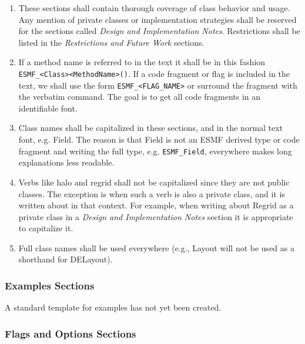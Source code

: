 \begin{enumerate}
\item These sections shall contain thorough coverage of class
behavior and usage.  Any mention of private classes or implementation 
strategies shall be reserved for the sections called {\it Design and 
Implementation Notes}.  Restrictions shall be listed in the 
{\it Restrictions and Future Work} sections.
  
\item If a method name is referred to in the text it shall be in this
fashion {\tt ESMF\_<Class><MethodName>()}.  If a code fragment or flag is
included in the text, we shall use the form {\tt ESMF\_<FLAG\_NAME>} 
or surround the fragment with the \latex  verbatim command.  The 
goal is to get all code fragments in an identifiable font.

\item Class names shall be capitalized in these sections, and
in the normal text font, e.g. Field.  The reason is that 
Field is not an ESMF derived type or code fragment and writing 
the full type, e.g. {\tt ESMF\_Field}, everywhere makes long 
explanations less readable.

\item Verbs like halo and regrid shall not be capitalized since they 
are not public classes. The exception is when such a verb is also a
private class, and it is written about in that context.  For example, 
when writing about Regrid as a private class in a {\it Design and 
Implementation Notes} section it is appropriate to capitalize it.

\item Full class names shall be used everywhere (e.g., Layout will
not be used as a shorthand for DELayout).

\end{enumerate}

\subsubsection{Examples Sections}

A standard template for examples has not yet been created.

\subsubsection{Flags and Options Sections}


